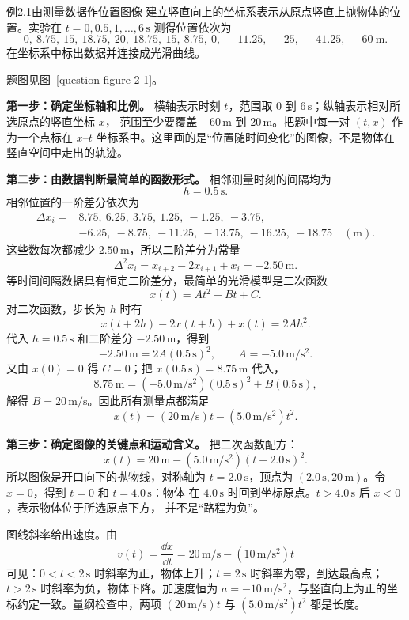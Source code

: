\begin{origexamplebox}{例2.1\quad 由测量数据作位置图像}
建立竖直向上的坐标系表示从原点竖直上抛物体的位置。实验在 $t=0,0.5,1,\ldots,6\,\mathrm{s}$ 测得位置依次为
\[
0,\ 8.75,\ 15,\ 18.75,\ 20,\ 18.75,\ 15,\ 8.75,\ 0,\ -11.25,\ -25,\ -41.25,\ -60\ \mathrm{m}.
\]
在坐标系中标出数据并连接成光滑曲线。
\par 题图见图~\ref{question-figure-2-1}。
\KQuestionAB
\end{origexamplebox}
\begin{xesolution}
\textbf{第一步：确定坐标轴和比例。}
横轴表示时刻 $t$，范围取 $0$ 到 $6\,\mathrm{s}$；纵轴表示相对所选原点的竖直坐标 $x$，
范围至少要覆盖 $-60\,\mathrm{m}$ 到 $20\,\mathrm{m}$。把题中每一对 $(t,x)$ 作为一个点标在
$x$--$t$ 坐标系中。这里画的是“位置随时间变化”的图像，不是物体在竖直空间中走出的轨迹。

\textbf{第二步：由数据判断最简单的函数形式。}
相邻测量时刻的间隔均为
\[
 h=0.5\,\mathrm{s}.
\]
相邻位置的一阶差分依次为
\[
\begin{aligned}
\Delta x_i={}&8.75,\ 6.25,\ 3.75,\ 1.25,\ -1.25,\ -3.75,\\
              &-6.25,\ -8.75,\ -11.25,\ -13.75,\ -16.25,\ -18.75
              \quad(\mathrm m).
\end{aligned}
\]
这些数每次都减少 $2.50\,\mathrm m$，所以二阶差分为常量
\[
 \Delta^2x_i=x_{i+2}-2x_{i+1}+x_i=-2.50\,\mathrm m.
\]
等时间间隔数据具有恒定二阶差分，最简单的光滑模型是二次函数
\[
 x(t)=At^2+Bt+C.
\]
对二次函数，步长为 $h$ 时有
\[
 x(t+2h)-2x(t+h)+x(t)=2Ah^2.
\]
代入 $h=0.5\,\mathrm s$ 和二阶差分 $-2.50\,\mathrm m$，得到
\[
 -2.50\,\mathrm m=2A(0.5\,\mathrm s)^2,
 \qquad A=-5.0\,\mathrm{m/s^2}.
\]
又由 $x(0)=0$ 得 $C=0$；把 $x(0.5\,\mathrm s)=8.75\,\mathrm m$ 代入，
\[
 8.75\,\mathrm m
 =(-5.0\,\mathrm{m/s^2})(0.5\,\mathrm s)^2
 +B(0.5\,\mathrm s),
\]
解得 $B=20\,\mathrm{m/s}$。因此所有测量点都满足
\[
 \boxed{x(t)=(20\,\mathrm{m/s})t-(5.0\,\mathrm{m/s^2})t^2}.
\]

\textbf{第三步：确定图像的关键点和运动含义。}
把二次函数配方：
\[
 x(t)=20\,\mathrm m
 -(5.0\,\mathrm{m/s^2})(t-2.0\,\mathrm s)^2.
\]
所以图像是开口向下的抛物线，对称轴为 $t=2.0\,\mathrm s$，顶点为
$(2.0\,\mathrm s,20\,\mathrm m)$。令 $x=0$，得到 $t=0$ 和 $t=4.0\,\mathrm s$：物体
在 $4.0\,\mathrm s$ 时回到坐标原点。$t>4.0\,\mathrm s$ 后 $x<0$，表示物体位于所选原点下方，
并不是“路程为负”。

图线斜率给出速度。由
\[
 v(t)=\frac{\dd x}{\dd t}
 =20\,\mathrm{m/s}-(10\,\mathrm{m/s^2})t
\]
可见：$0<t<2\,\mathrm s$ 时斜率为正，物体上升；$t=2\,\mathrm s$ 时斜率为零，到达最高点；
$t>2\,\mathrm s$ 时斜率为负，物体下降。加速度恒为
$a=-10\,\mathrm{m/s^2}$，与竖直向上为正的坐标约定一致。量纲检查中，两项
$(20\,\mathrm{m/s})t$ 与 $(5.0\,\mathrm{m/s^2})t^2$ 都是长度。


\end{xesolution}
